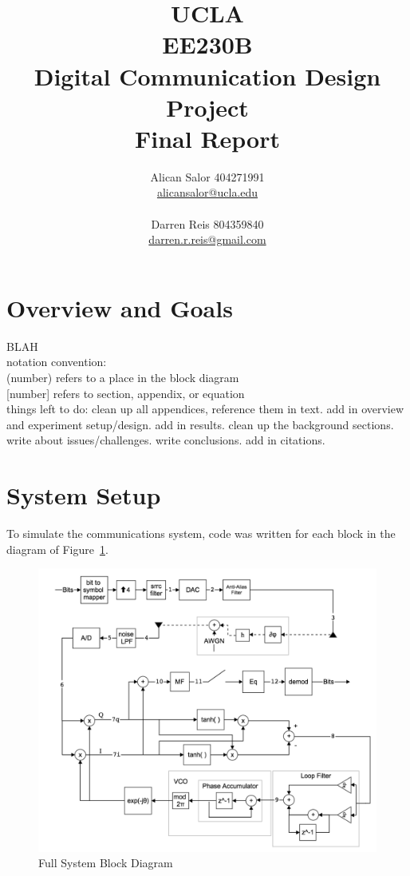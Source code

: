 \documentclass[]{article}
\title{UCLA\\EE230B\\Digital Communication Design Project\\Final Report}
\author{Alican Salor 404271991 \\  \href{mailto:alicansalor@ucla.edu}{alicansalor@ucla.edu} \\ \\
Darren Reis 804359840 \\
\href{mailto:darrer.r.reis@gmail.com}{darren.r.reis@gmail.com} }
\begin{document}
\maketitle

\newpage
\tableofcontents
\newpage
\section{Overview and Goals}
\label{sec:overview}
BLAH\\

notation convention:\\

(number) refers to a place in the block diagram\\

[number] refers to section, appendix, or equation\\

things left to do:  clean up all appendices, reference them in text.  add in overview and experiment setup/design.  add in results.  clean up the background sections.  write about issues/challenges.  write conclusions.  add in citations.

\section{System Setup}
\label{sec:}
To simulate the communications system, code was written for each block in the diagram of Figure~\ref{fig:system}.
 
\begin{figure}[H]
\centering
\includegraphics[width=\textwidth]{systemfinal.png}
\caption{Full System Block Diagram\label{fig:system}}
\end{figure}
\end{document}
